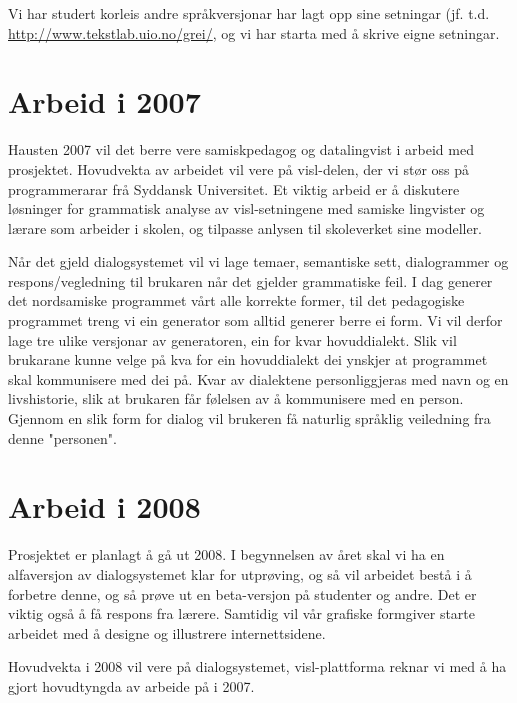 \documentclass[a4paper,norsk]{article}
\begin{document}
Vi har studert korleis andre språkversjonar har lagt opp sine setningar (jf. t.d. \url{http://www.tekstlab.uio.no/grei/}, og vi har starta med å skrive eigne setningar.

\section{Arbeid i 2007}

Hausten 2007 vil det berre vere samiskpedagog og datalingvist i arbeid med prosjektet. Hovudvekta av arbeidet vil vere på visl-delen, der vi stør oss på programmerarar frå Syddansk Universitet. Et viktig arbeid er å diskutere løsninger for grammatisk analyse av visl-setningene med samiske lingvister og lærare som arbeider i skolen, og tilpasse anlysen til skoleverket sine modeller.

Når det gjeld dialogsystemet vil vi lage temaer, semantiske sett, dialogrammer og respons/vegledning til brukaren når det gjelder grammatiske feil. I dag generer det nordsamiske programmet vårt alle korrekte former, til det pedagogiske programmet treng vi ein generator som alltid generer berre ei form. Vi vil derfor lage tre ulike versjonar av generatoren, ein for kvar hovuddialekt. Slik vil brukarane kunne velge på kva for ein hovuddialekt dei ynskjer at programmet skal kommunisere med dei på. Kvar av dialektene personliggjeras med navn og en livshistorie, slik at brukaren får følelsen av å kommunisere med en person. Gjennom en slik form for dialog vil brukeren få naturlig språklig veiledning fra denne "personen". 

\section{Arbeid i 2008}

Prosjektet er planlagt å gå ut 2008. I begynnelsen av året skal vi ha en alfaversjon av dialogsystemet klar for utprøving, og så vil arbeidet bestå i å forbetre denne, og så prøve ut en beta-versjon på studenter og andre. Det er viktig også å få respons fra lærere. Samtidig vil vår grafiske formgiver starte arbeidet med å designe og illustrere internettsidene.

Hovudvekta i 2008 vil vere på dialogsystemet, visl-plattforma reknar vi med å ha gjort hovudtyngda av arbeide på i 2007. 
\end{document}
